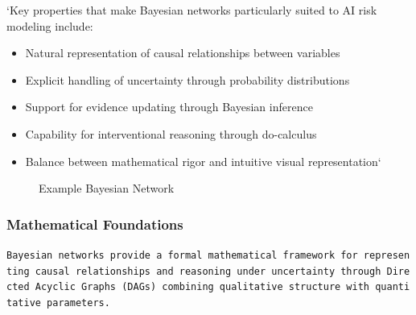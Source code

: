 \documentclass[
  11pt,
  letterpaper,
]{book}
\providecommand{\tightlist}{%
  \setlength{\itemsep}{0pt}\setlength{\parskip}{0pt}}
\begin{document}
`Key properties that make Bayesian networks particularly suited to AI
risk modeling include:

\begin{itemize}
\tightlist
\item
  Natural representation of causal relationships between variables
\item
  Explicit handling of uncertainty through probability distributions
\item
  Support for evidence updating through Bayesian inference
\item
  Capability for interventional reasoning through do-calculus
\item
  Balance between mathematical rigor and intuitive visual
  representation`
\end{itemize}

\begin{figure}


\caption{\label{fig-bayesian-network}Example Bayesian Network}

\end{figure}%

\subsubsection{Mathematical
Foundations}\label{sec-mathematical-foundations}

\texttt{Bayesian\ networks\ provide\ a\ formal\ mathematical\ framework\ for\ representing\ causal\ relationships\ and\ reasoning\ under\ uncertainty\ through\ Directed\ Acyclic\ Graphs\ (DAGs)\ combining\ qualitative\ structure\ with\ quantitative\ parameters.}
\end{document}
